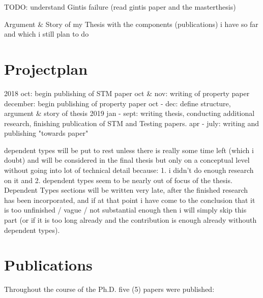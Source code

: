 TODO: understand Gintis failure (read gintis paper and the masterthesis)

Argument \& Story of my Thesis with the components (publications) i have so far and which i still plan to do

\section{Projectplan}
2018
oct: begin publishing of STM paper
oct \& nov: writing of property paper
december: begin publishing of property paper
oct - dec: define structure, argument \& story of thesis
2019
jan - sept: writing thesis, conducting additional research, finishing publication of STM and Testing papers.
apr - july: writing and publishing "towards paper"

dependent types will be put to rest unless there is really some time left (which i doubt) and will be considered in the final thesis but only on a conceptual level without going into lot of technical detail because: 1. i didn't do enough research on it and 2. dependent types seem to be nearly out of focus of the thesis. Dependent Types sections will be written very late, after the finished research has been incorporated, and if at that point i have come to the conclusion that it is too unfinished / vague / not substantial enough then i will simply skip this part (or if it is too long already and the contribution is enough already withouth dependent types).

\section{Publications}
Throughout the course of the Ph.D. five (5) papers were published:

